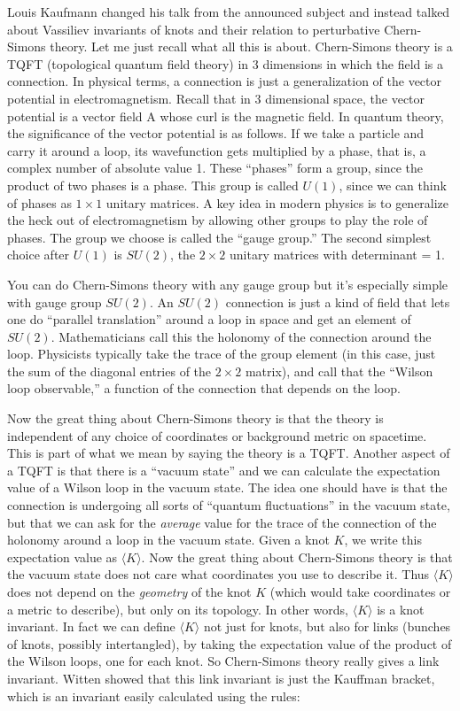 \documentclass{article}
\begin{document}
Louis Kaufmann changed his talk from the announced subject and instead
talked about Vassiliev invariants of knots and their relation to
perturbative Chern-Simons theory. Let me just recall what all this is
about. Chern-Simons theory is a TQFT (topological quantum field theory)
in 3 dimensions in which the field is a connection. In physical terms, a
connection is just a generalization of the vector potential in
electromagnetism. Recall that in 3 dimensional space, the vector
potential is a vector field A whose curl is the magnetic field. In
quantum theory, the significance of the vector potential is as follows.
If we take a particle and carry it around a loop, its wavefunction gets
multiplied by a phase, that is, a complex number of absolute value 1.
These ``phases'' form a group, since the product of two phases is a
phase. This group is called \(U(1)\), since we can think of phases as
\(1\times1\) unitary matrices. A key idea in modern physics is to
generalize the heck out of electromagnetism by allowing other groups to
play the role of phases. The group we choose is called the ``gauge
group.'' The second simplest choice after \(U(1)\) is \(SU(2)\), the
\(2\times2\) unitary matrices with determinant = 1.

You can do Chern-Simons theory with any gauge group but it's especially
simple with gauge group \(SU(2)\). An \(SU(2)\) connection is just a
kind of field that lets one do ``parallel translation'' around a loop in
space and get an element of \(SU(2)\). Mathematicians call this the
holonomy of the connection around the loop. Physicists typically take
the trace of the group element (in this case, just the sum of the
diagonal entries of the \(2\times2\) matrix), and call that the ``Wilson
loop observable,'' a function of the connection that depends on the
loop.

Now the great thing about Chern-Simons theory is that the theory is
independent of any choice of coordinates or background metric on
spacetime. This is part of what we mean by saying the theory is a TQFT.
Another aspect of a TQFT is that there is a ``vacuum state'' and we can
calculate the expectation value of a Wilson loop in the vacuum state.
The idea one should have is that the connection is undergoing all sorts
of ``quantum fluctuations'' in the vacuum state, but that we can ask for
the \emph{average} value for the trace of the connection of the holonomy
around a loop in the vacuum state. Given a knot \(K\), we write this
expectation value as \(\langle K \rangle\). Now the great thing about
Chern-Simons theory is that the vacuum state does not care what
coordinates you use to describe it. Thus \(\langle K \rangle\) does not
depend on the \emph{geometry} of the knot \(K\) (which would take
coordinates or a metric to describe), but only on its topology. In other
words, \(\langle K \rangle\) is a knot invariant. In fact we can define
\(\langle K \rangle\) not just for knots, but also for links (bunches of
knots, possibly intertangled), by taking the expectation value of the
product of the Wilson loops, one for each knot. So Chern-Simons theory
really gives a link invariant. Witten showed that this link invariant is
just the Kauffman bracket, which is an invariant easily calculated using
the rules:
\end{document}
